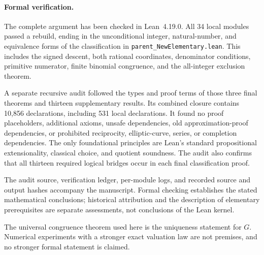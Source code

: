 \documentclass[11pt,a4paper]{article}
\theoremstyle{definition}
\begin{document}
\paragraph{Formal verification.}
The complete argument has been checked in Lean~4.19.0. All 34 local
modules passed a rebuild, ending in the unconditional integer,
natural-number, and equivalence forms of the classification in
\texttt{parent\_NewElementary.lean}. This includes the signed descent,
both rational coordinates, denominator conditions, primitive numerator,
finite binomial congruence, and the all-integer exclusion theorem.

A separate recursive audit followed the types and proof terms of those
three final theorems and thirteen supplementary results. Its combined
closure contains 10,856 declarations, including 531 local declarations.
It found no proof placeholders, additional axioms, unsafe dependencies,
old approximation-proof dependencies, or prohibited reciprocity,
elliptic-curve, series, or completion dependencies. The only foundational
principles are Lean's standard propositional extensionality, classical
choice, and quotient soundness. The audit also confirms that all thirteen
required logical bridges occur in each final classification proof.

The audit source, verification ledger, per-module logs, and recorded
source and output hashes accompany the manuscript.
Formal checking establishes the stated mathematical conclusions;
historical attribution and the description of elementary prerequisites
are separate assessments, not conclusions of the Lean kernel.

The universal congruence theorem used here is the uniqueness statement
for \(G\). Numerical experiments with a stronger exact valuation law
are not premises, and no stronger formal statement is claimed.
\end{document}
